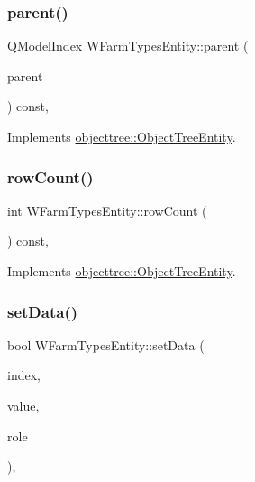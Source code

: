 \subsubsection{\texorpdfstring{parent()}{parent()}}
{\footnotesize\ttfamily Q\+Model\+Index W\+Farm\+Types\+Entity\+::parent (\begin{DoxyParamCaption}\item[{const Q\+Model\+Index \&}]{parent }\end{DoxyParamCaption}) const\hspace{0.3cm}{\ttfamily [override]}, {\ttfamily [virtual]}}



Implements \mbox{\hyperlink{classobjecttree_1_1_object_tree_entity_a2d1b13c056476f87637aacd7e99e7305}{objecttree\+::\+Object\+Tree\+Entity}}.

\mbox{\label{classobjecttree_1_1_w_farm_types_entity_a79fea0a65bed3d3e29b78e15a5db63df}} 
\subsubsection{\texorpdfstring{rowCount()}{rowCount()}}
{\footnotesize\ttfamily int W\+Farm\+Types\+Entity\+::row\+Count (\begin{DoxyParamCaption}{ }\end{DoxyParamCaption}) const\hspace{0.3cm}{\ttfamily [override]}, {\ttfamily [virtual]}}



Implements \mbox{\hyperlink{classobjecttree_1_1_object_tree_entity_a82c626bb28c55dcfce11cf7ec3368588}{objecttree\+::\+Object\+Tree\+Entity}}.

\mbox{\label{classobjecttree_1_1_w_farm_types_entity_af3717238037dde2fb8c314814e17f70d}} 
\subsubsection{\texorpdfstring{setData()}{setData()}}
{\footnotesize\ttfamily bool W\+Farm\+Types\+Entity\+::set\+Data (\begin{DoxyParamCaption}\item[{const Q\+Model\+Index \&}]{index,  }\item[{const Q\+Variant \&}]{value,  }\item[{int}]{role }\end{DoxyParamCaption})\hspace{0.3cm}{\ttfamily [override]}, {\ttfamily [virtual]}}



